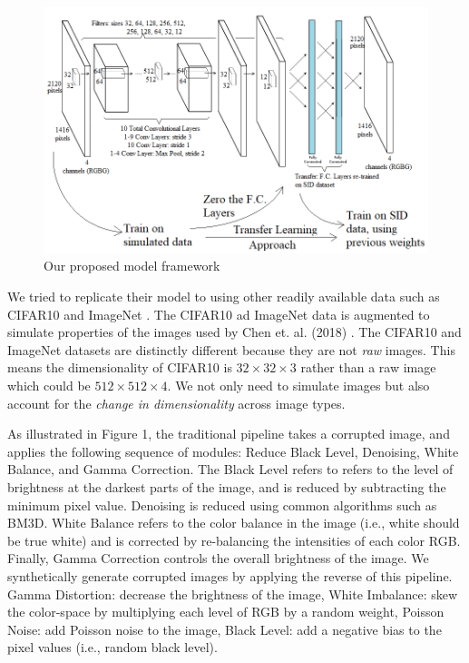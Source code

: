 \documentclass{article}
\begin{document}
\begin{figure}[ht]
  \centering
  \includegraphics[scale=0.5]{model}
  \caption{Our proposed model framework}
\end{figure}

We tried to replicate their model to using other readily
available data such as CIFAR10 \cite{cifar10} and ImageNet
\cite{imagenet_cvpr09}. The CIFAR10 ad ImageNet data is augmented to
simulate properties of the images used by Chen et. al. (2018)
\cite{chen2018learning}. The CIFAR10 and ImageNet datasets are distinctly
different because they are not \textit{raw} images. This means the
dimensionality of CIFAR10 is $32 \times 32 \times 3$ rather than a raw
image which could be $512 \times 512 \times 4$. We not only need to
simulate images but also account for the \textit{change in dimensionality}
across image types.


As illustrated in Figure 1, the traditional pipeline takes a corrupted image, and applies the following sequence of modules: Reduce Black Level, Denoising, White Balance, and Gamma Correction. The Black Level refers to refers to the level of brightness at the darkest parts of the image, and is reduced by subtracting the minimum pixel value. Denoising is reduced using common algorithms such as BM3D. White Balance refers to the color balance in the image (i.e., white should be true white) and is corrected by re-balancing the intensities of each color RGB. Finally, Gamma Correction controls the overall brightness of the image. We synthetically generate corrupted images by applying the reverse of this pipeline. Gamma Distortion: decrease the brightness of the image, White Imbalance: skew the color-space by multiplying each level of RGB by a random weight, Poisson Noise: add Poisson noise to the image, Black Level: add a negative bias to the pixel values (i.e., random black level). 
\end{document}
